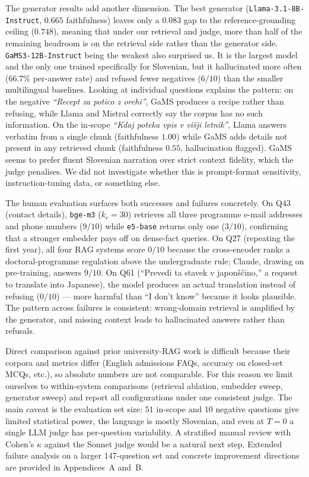 \documentclass[fleqn,moreauthors,10pt]{ds_report}
\begin{document}
The generator results add another dimension. The best generator (\texttt{Llama-3.1-8B-Instruct}, $0.665$ faithfulness) leaves only a $0.083$ gap to the reference-grounding ceiling ($0.748$), meaning that under our retrieval and judge, more than half of the remaining headroom is on the retrieval side rather than the generator side. \texttt{GaMS3-12B-Instruct} being the weakest also surprised us. It is the largest model and the only one trained specifically for Slovenian, but it hallucinated more often ($66.7\%$ per-answer rate) and refused fewer negatives ($6/10$) than the smaller multilingual baselines. Looking at individual questions explains the pattern: on the negative \emph{``Recept za potico z orehi''}, GaMS produces a recipe rather than refusing, while Llama and Mistral correctly say the corpus has no such information. On the in-scope \emph{``Kdaj poteka vpis v višji letnik''}, Llama answers verbatim from a single chunk (faithfulness $1.00$) while GaMS adds details not present in any retrieved chunk (faithfulness $0.55$, hallucination flagged). GaMS seems to prefer fluent Slovenian narration over strict context fidelity, which the judge penalises. We did not investigate whether this is prompt-format sensitivity, instruction-tuning data, or something else.

The human evaluation surfaces both successes and failures concretely. On Q43 (contact details), \texttt{bge-m3} ($k_r{=}30$) retrieves all three programme e-mail addresses and phone numbers ($9/10$) while \texttt{e5-base} returns only one ($3/10$), confirming that a stronger embedder pays off on dense-fact queries. On Q27 (repeating the first year), all four RAG systems score $0/10$ because the cross-encoder ranks a doctoral-programme regulation above the undergraduate rule; Claude, drawing on pre-training, answers $9/10$. On Q61 (``Prevedi ta stavek v japonščino,'' a request to translate into Japanese), the model produces an actual translation instead of refusing ($0/10$) — more harmful than ``I don't know'' because it looks plausible. The pattern across failures is consistent: wrong-domain retrieval is amplified by the generator, and missing context leads to hallucinated answers rather than refusals.

Direct comparison against prior university-RAG work \cite{llmStudentAdmissions,mississippiUniversity2024,universityOpenDaysLocalLLMs} is difficult because their corpora and metrics differ (English admissions FAQs, accuracy on closed-set MCQs, etc.), so absolute numbers are not comparable. For this reason we limit ourselves to within-system comparisons (retrieval ablation, embedder sweep, generator sweep) and report all configurations under one consistent judge. The main caveat is the evaluation set size: $51$ in-scope and $10$ negative questions give limited statistical power, the language is mostly Slovenian, and even at $T{=}0$ a single LLM judge has per-question variability. A stratified manual review with Cohen's $\kappa$ against the Sonnet judge would be a natural next step. Extended failure analysis on a larger 147-question set and concrete improvement directions are provided in Appendices~A and~B.
\end{document}
